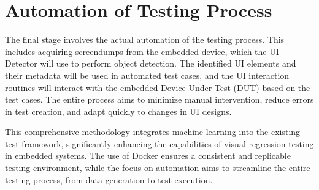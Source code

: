 \documentclass[Proposal,BIC,english,IEEE]{BASE/twbook} %
\begin{document}
\section{Automation of Testing Process}
The final stage involves the actual automation of the testing process. This includes acquiring screendumps from the embedded device, which the UI-Detector will use to perform object detection. The identified UI elements and their metadata will be used in automated test cases, and the UI interaction routines will interact with the embedded Device Under Test (DUT) based on the test cases. The entire process aims to minimize manual intervention, reduce errors in test creation, and adapt quickly to changes in UI designs.

This comprehensive methodology integrates machine learning into the existing test framework, significantly enhancing the capabilities of visual regression testing in embedded systems. The use of Docker ensures a consistent and replicable testing environment, while the focus on automation aims to streamline the entire testing process, from data generation to test execution.

\clearpage                                                       %

\clearpage

\clearpage

\clearpage

\clearpage

{}
\end{document}
